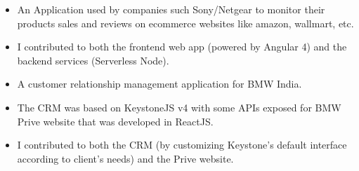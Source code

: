 \documentclass[10pt,a4paper,ragged2e]{altacv}
\begin{document}
\begin{itemize}
\item An Application used by companies such Sony/Netgear to monitor their products sales and reviews on ecommerce websites like amazon, wallmart, etc.
\item I contributed to both the frontend web app (powered by Angular 4) and the backend services (Serverless Node).
\end{itemize}
\smallskip
\smallskip

\begin{itemize}
\item A customer relationship management application for BMW India. 
\item The CRM was based on KeystoneJS v4 with some APIs exposed for BMW Prive website that was developed in ReactJS. 
\item I contributed to both the CRM (by customizing Keystone's default interface according to client's needs) and the Prive website.
\end{itemize}
\smallskip
\smallskip


\cvproject{}

\divider


\clearpage

\nocite{*}
\end{document}
